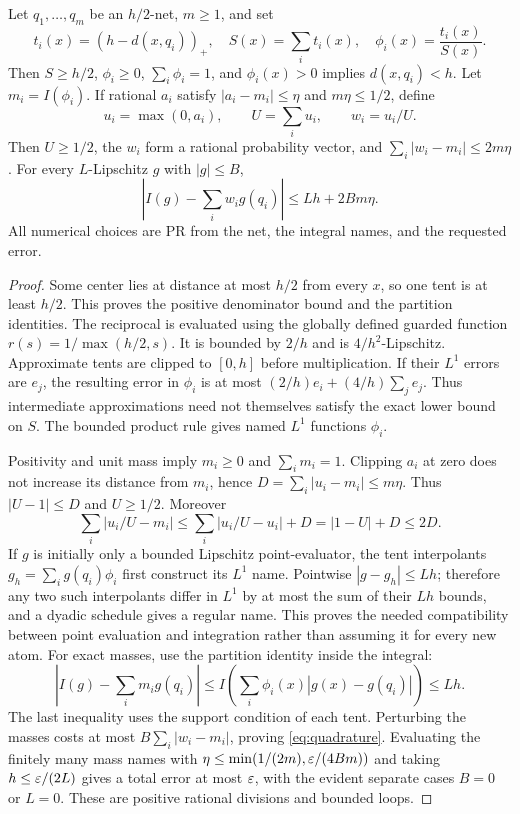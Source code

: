 \begin{lemma}\label{lem:tent-quadrature}
Let $q_1,\ldots,q_m$ be an $h/2$-net, $m\ge1$, and set
\[
 t_i(x)=(h-d(x,q_i))_+,\quad S(x)=\sum_it_i(x),\quad
 \phi_i(x)=\frac{t_i(x)}{S(x)}.
\]
Then $S\ge h/2$, $\phi_i\ge0$, $\sum_i\phi_i=1$, and
$\phi_i(x)>0$ implies $d(x,q_i)<h$.
Let $m_i=I(\phi_i)$. If rational $a_i$ satisfy $|a_i-m_i|\le\eta$
and $m\eta\le1/2$, define
\[
 u_i=\max(0,a_i),\qquad U=\sum_iu_i,\qquad w_i=u_i/U.
\]
Then $U\ge1/2$, the $w_i$ form a rational probability vector, and
$\sum_i|w_i-m_i|\le2m\eta$.
For every $L$-Lipschitz $g$ with $|g|\le B$,
\begin{equation}\label{eq:quadrature}
 \left|I(g)-\sum_iw_i g(q_i)\right|
 \le Lh+2Bm\eta.
\end{equation}
All numerical choices are PR from the net, the integral names, and the
requested error.
\end{lemma}
\begin{proof}
Some center lies at distance at most $h/2$ from every $x$, so one tent is
at least $h/2$. This proves the positive denominator bound and the
partition identities. The reciprocal is evaluated using the globally
defined guarded function $r(s)=1/\max(h/2,s)$. It is bounded by $2/h$
and is $4/h^2$-Lipschitz. Approximate tents are clipped to $[0,h]$
before multiplication. If their $L^1$ errors are $e_j$, the resulting
error in $\phi_i$ is at most $(2/h)e_i+(4/h)\sum_je_j$. Thus intermediate
approximations need not themselves satisfy the exact lower bound on $S$.
The bounded product rule gives named $L^1$ functions $\phi_i$.

Positivity and unit mass imply $m_i\ge0$ and $\sum_im_i=1$.
Clipping $a_i$ at zero does not increase its distance from $m_i$, hence
$D=\sum_i|u_i-m_i|\le m\eta$. Thus $|U-1|\le D$ and $U\ge1/2$.
Moreover
\[
 \sum_i|u_i/U-m_i|
 \le\sum_i|u_i/U-u_i|+D
 =|1-U|+D\le2D.
\]
If $g$ is initially only a bounded Lipschitz point-evaluator, the tent
interpolants $g_h=\sum_i g(q_i)\phi_i$ first construct its $L^1$ name.
Pointwise $|g-g_h|\le Lh$; therefore any two such interpolants differ
in $L^1$ by at most the sum of their $Lh$ bounds, and a dyadic schedule
gives a regular name. This proves the needed compatibility between point
evaluation and integration rather than assuming it for every new atom.
For exact masses, use the partition identity inside the integral:
\[
 \left|I(g)-\sum_im_i g(q_i)\right|
 \le I\left(\sum_i\phi_i(x)|g(x)-g(q_i)|\right)\le Lh.
\]
The last inequality uses the support condition of each tent. Perturbing
the masses costs at most $B\sum_i|w_i-m_i|$, proving
\eqref{eq:quadrature}. Evaluating the finitely many mass names with
$\eta\le\min(1/(2m),\varepsilon/(4Bm))$ and taking $h\le\varepsilon/(2L)$ gives
a total error at most $\varepsilon$, with the evident separate cases $B=0$ or
$L=0$. These are positive rational divisions and bounded loops.
\end{proof}

